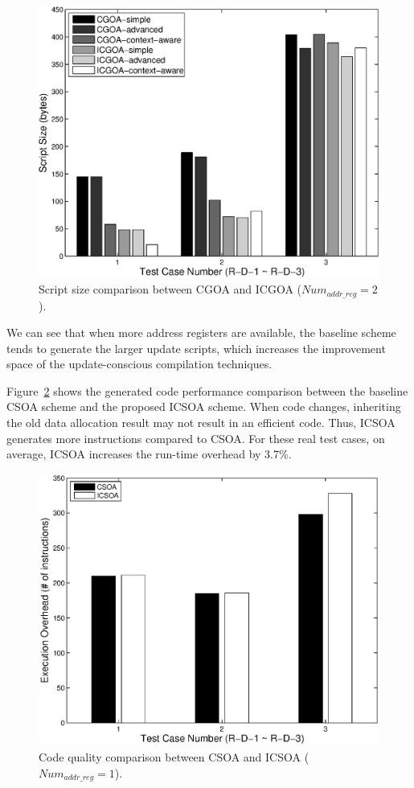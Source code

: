 \begin{figure}[htbp]
\centering
\includegraphics[scale=0.6]{./figures/updatem2.eps}
\caption{Script size comparison between CGOA and ICGOA ($Num_{addr\_reg} = 2$).}
\label{update2-dsp-real}
\vspace{-0.1in}
\end{figure}

We can see that when more address registers are available, the baseline scheme tends to generate the larger update scripts, which increases the improvement space of the update-conscious compilation techniques.

Figure~\ref{exe-dsp-real} shows the generated code performance comparison between the baseline CSOA scheme and the proposed ICSOA scheme. When code changes, inheriting the old data allocation result may not result in an efficient code. Thus, ICSOA generates more instructions compared to CSOA. For these real test cases, on average, ICSOA increases the run-time overhead by 3.7\%. 
\begin{figure}[htbp]
\centering
\includegraphics[scale=0.6]{figures/da-exe2.eps}
\caption{Code quality comparison between CSOA and ICSOA ($Num_{addr\_reg} = 1$).}
\label{exe-dsp-real}
\vspace{-0.2in}
\end{figure}


